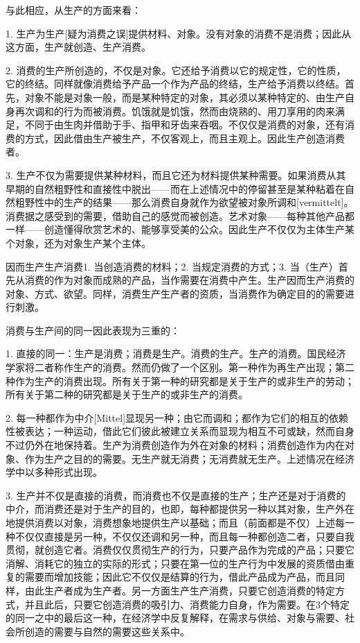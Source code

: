 \documentclass[a4paper,twoside,12pt]{ctexart}
\begin{document}
与此相应，从生产的方面来看：

1. 生产为生产[疑为消费之误]提供材料、对象。没有对象的消费不是消费；因此从这方面，生产就创造、生产消费。

2. 消费的生产所创造的，不仅是对象。它还给予消费以它的规定性，它的性质，它的终结。同样就像消费给予产品一个作为产品的终结，生产给予消费以终结。首先，对象不能是对象一般，而是某种特定的对象，其必须以某种特定的、由生产自身再次调和的行为而被消费。饥饿就是饥饿，然而由烧熟的、用刀享用的肉来满足，不同于由生肉并借助于手、指甲和牙齿来吞咽。不仅仅是消费的对象，还有消费的方式，因此借由生产被生产，不仅客观上，而且主观上。因此生产创造消费者。

3. 生产不仅为需要提供某种材料，而且它还为材料提供某种需要。如果消费从其早期的自然粗野性和直接性中脱出——而在上述情况中的停留甚至是某种粘着在自然粗野性中的生产的结果——那么消费自身就作为欲望被对象所调和[vermittelt]。消费据之感受到的需要，借助自己的感觉而被创造。艺术对象——每种其他产品都一样——创造懂得欣赏艺术的、能够享受美的公众。因此生产不仅仅为主体生产某个对象，还为对象生产某个主体。

因而生产生产消费1. 当创造消费的材料；2. 当规定消费的方式；3. 当（生产）首先从消费的作为对象而成熟的产品，当作需要在消费中产生。生产因而生产消费的对象、方式、欲望。同样，消费生产生产者的资质，当消费作为确定目的的需要进行刺激。

消费与生产间的同一因此表现为三重的：

1. 直接的同一：生产是消费；消费是生产。消费的生产。生产的消费。国民经济学家将二者称作生产的消费。然而仍做了一个区别。第一种作为再生产出现；第二种作为生产的消费出现。所有关于第一种的研究都是关于生产的或非生产的劳动；所有关于第二种的研究都是关于生产的或非生产的消费。

2. 每一种都作为中介[Mittel]显现另一种；由它而调和；都作为它们的相互的依赖性被表达；一种运动，借此它们彼此被建立关系而显现为相互不可或缺，然而自身不过仍外在地保持着。生产为消费创造作为外在对象的材料；消费创造作为内在对象、作为生产之目的的需要。无生产就无消费；无消费就无生产。上述情况在经济学中以多种形式出现。

3. 生产并不仅是直接的消费，而消费也不仅是直接的生产；生产还是对于消费的中介，而消费还是对于生产的目的，也即，每种都提供另一种以其对象，生产外在地提供消费以对象，消费想象地提供生产以基础；而且（前面都是不仅）上述每一种不仅仅直接是另一种，不仅仅还调和另一种，而且每一种都创造二者，只要自我贯彻，就创造它者。消费仅仅贯彻生产的行为，只要产品作为完成的产品；只要它消解、消耗它的独立的实际的形式；只要在第一位的生产行为中发展的资质借由重复的需要而增加技能；因此它不仅仅是结算的行为，借此产品成为产品，而且同样，由此生产者成为生产者。另一方面生产生产消费，只要它创造消费的特定方式，并且此后，只要它创造消费的吸引力、消费能力自身，作为需要。在3个特定的同一之中的最后这一种，在经济学中反复解释，在需求与供给、对象与需要、社会所创造的需要与自然的需要这些关系中。
\end{document}
